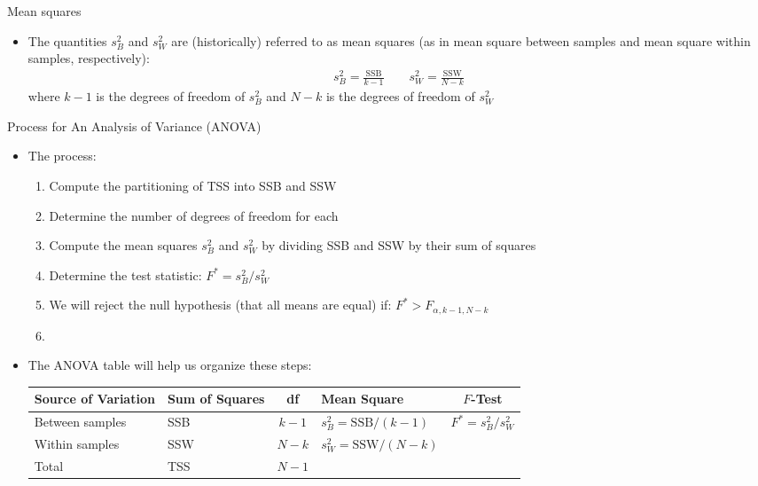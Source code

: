 \documentclass[xcolor=dvipsnames]{beamer}
\begin{document}
\begin{frame}{Mean squares}
	\begin{itemize}
		\item The quantities $s^2_B$ and $s^2_W$ are (historically) referred to as mean squares (as in mean square between samples and mean square within samples, respectively): \pause
		\begin{gather*}
			s^2_B = \frac{\text{SSB}}{k-1} \quad \quad s^2_W = \frac{\text{SSW}}{N-k}
		\end{gather*}
		where $k-1$ is the degrees of freedom of $s^2_B$ and $N-k$ is the degrees of freedom of $s^2_W$
	\end{itemize}
\end{frame}

\begin{frame}{Process for An Analysis of Variance (ANOVA)}
	\begin{itemize}
		\item The process: \pause
		\begin{enumerate}
			\item Compute the partitioning of TSS into SSB and SSW \pause
			\item Determine the number of degrees of freedom for each \pause
			\item Compute the mean squares $s_B^2$ and $s_W^2$ by dividing SSB and SSW by their sum of squares \pause
			\item Determine the test statistic: $F^* = s_B^2 / s_W^2$ \pause
			\item We will reject the null hypothesis (that all means are equal) if: $F^* > F_{\alpha, k-1, N-k}$ \pause
			\item[]
		\end{enumerate}
	\item The ANOVA table will help us organize these steps: \pause
	\vspace{2mm}
	\begin{center}
		{\scriptsize
		\begin{tabular}{lp{1.2cm}cp{2.5cm}c}
			\hline 
			\textbf{Source of Variation} & \textbf{Sum of Squares} & \textbf{df} & \textbf{Mean Square} & $F$-\textbf{Test} \\ \hline 
			Between samples & SSB & $k - 1$ & $s_B^2 = \text{SSB} / (k-1)$ & $F^* = s_B^2 / s_W^2$ \\
			Within samples & SSW & $N - k$ &  $s_W^2 = \text{SSW} / (N-k)$ & \\
			Total & TSS & $N-1$ & & \\ \hline
		\end{tabular}}
	\end{center}
	\end{itemize}
\end{frame}
\end{document}
